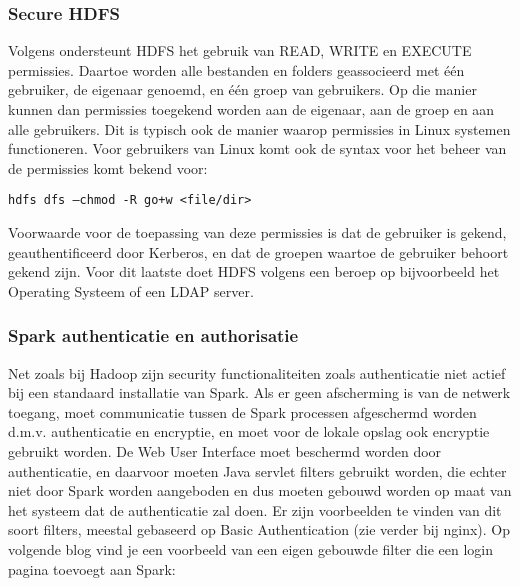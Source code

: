 \subsubsection{Secure HDFS}
Volgens \textcite{Hadoop2023b} ondersteunt HDFS het gebruik van READ, WRITE en EXECUTE permissies. Daartoe worden alle bestanden en folders geassocieerd met één gebruiker, de eigenaar genoemd, en één groep van gebruikers.
Op die manier kunnen dan permissies toegekend worden aan de eigenaar, aan de groep en aan alle gebruikers. Dit is typisch ook de manier waarop permissies in Linux systemen functioneren.
\newline
Voor gebruikers van Linux komt ook de syntax voor het beheer van de permissies komt bekend voor:
\begin{lstlisting}
hdfs dfs –chmod -R go+w <file/dir>
\end{lstlisting}
Voorwaarde voor de toepassing van deze permissies is dat de gebruiker is gekend, geauthentificeerd door Kerberos, en dat de groepen waartoe de gebruiker behoort gekend zijn. Voor dit laatste doet HDFS volgens \textcite{Hadoop2023c} een beroep op bijvoorbeeld het Operating Systeem of een LDAP server.


\subsubsection {Spark authenticatie en authorisatie} \autocite{Spark2023c}
Net zoals bij Hadoop zijn security functionaliteiten zoals authenticatie niet actief bij een standaard installatie van Spark. Als er geen afscherming is van de netwerk toegang, moet communicatie tussen de Spark processen afgeschermd worden d.m.v. authenticatie en encryptie, en moet voor de lokale opslag ook encryptie gebruikt worden. De Web User Interface moet beschermd worden door authenticatie, en daarvoor moeten Java servlet filters gebruikt worden, die echter niet door Spark worden aangeboden en dus moeten gebouwd worden op maat van het systeem dat de authenticatie zal doen.
Er zijn voorbeelden te vinden van dit soort filters, meestal gebaseerd op Basic Authentication (zie verder bij nginx). Op volgende blog vind je een voorbeeld van een eigen gebouwde filter die een login pagina toevoegt aan Spark: \textcite{Cacoveanu2019}
\newline
\newline



